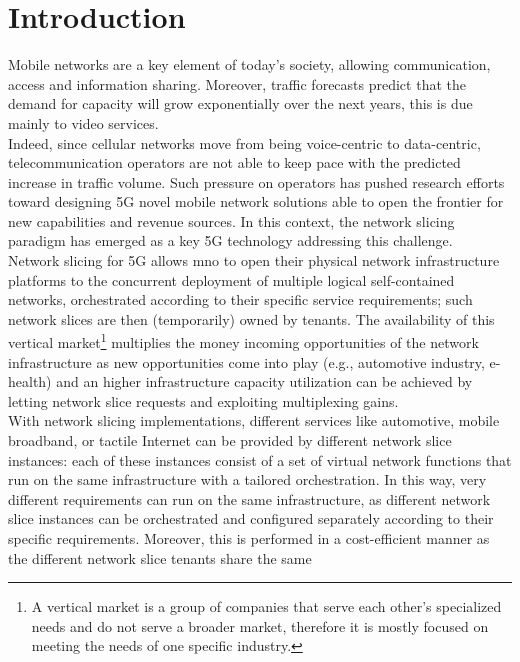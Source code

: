 \documentclass[a4paper,12pt]{report} %
\begin{document}

\newpage
{}
\setcounter{page}{1}
\pagestyle{fancy}
\section{Introduction}
Mobile networks are a key element of today's society, allowing communication, access
and information sharing. Moreover, traffic forecasts predict that the
demand for capacity will grow exponentially over the next years, this is due mainly to
video services.\\ 
Indeed, since cellular networks move from being voice-centric to
data-centric, telecommunication operators are not able to keep pace with the predicted
increase in traffic volume. Such pressure on operators has
pushed research efforts toward designing 5G novel mobile network solutions
able to open the frontier for new capabilities and revenue sources. In this context, the network
slicing paradigm has emerged as a key 5G technology addressing this challenge.\\
Network slicing for 5G allows \gls{mno} to open
their physical network infrastructure platforms to the concurrent deployment
of multiple logical self-contained networks, orchestrated according
to their specific service requirements; such network slices are then
(temporarily) owned by tenants. The availability of this vertical market\footnote{A vertical market is a group of companies that serve each other's specialized needs and do not serve a broader market, therefore it is mostly focused on meeting the needs of one specific industry.} multiplies
the money incoming opportunities of the network infrastructure as new
opportunities come into play (e.g., automotive industry, e-health) and an higher
infrastructure capacity utilization can be achieved by letting network slice
requests and exploiting multiplexing gains.\\
With network slicing implementations, different services like automotive,
mobile broadband, or tactile Internet can be provided by different network slice
instances: each of these instances consist of a set of virtual network functions
that run on the same infrastructure with a tailored orchestration. In this way,
very different requirements can run on the same infrastructure, as
different network slice instances can be orchestrated and configured separately
according to their specific requirements. Moreover, this is performed in a
cost-efficient manner as the different network slice tenants share the same
\end{document}
